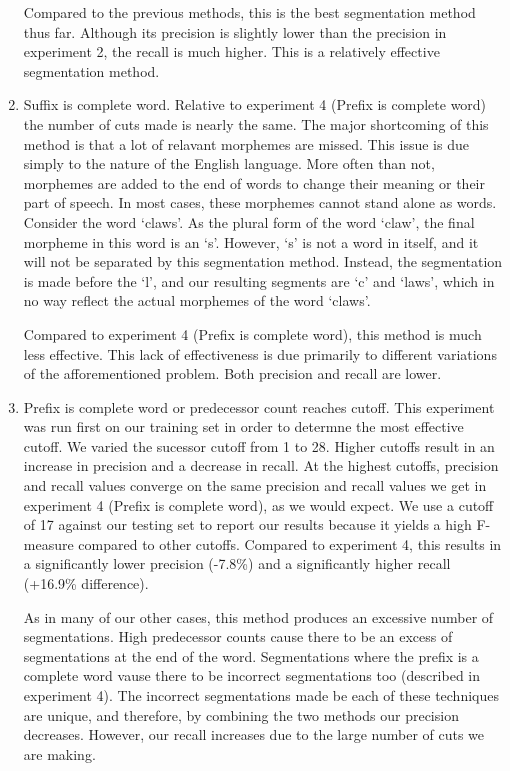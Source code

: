 \documentclass[11pt,letterpaper]{article}
\begin{document}
\begin{enumerate}
Compared to the previous methods, this is the best segmentation method thus far. Although its precision is slightly lower than the precision in experiment 2, the recall is much higher. This is a relatively effective segmentation method.

\item Suffix is complete word. Relative to experiment 4 (Prefix is complete word) the number of cuts made is nearly the same. The major shortcoming of this method is that a lot of relavant morphemes are missed. This issue is due simply to the nature of the English language. More often than not, morphemes are added to the end of words to change their meaning or their part of speech. In most cases, these morphemes cannot stand alone as words. Consider the word `claws'. As the plural form of the word `claw', the final morpheme in this word is an `s'. However, `s' is not a word in itself, and it will not be separated by this segmentation method. Instead, the segmentation is made before the `l', and our resulting segments are `c' and `laws', which in no way reflect the actual morphemes of the word `claws'.

Compared to experiment 4 (Prefix is complete word), this method is much less effective. This lack of effectiveness is due primarily to different variations of the afforementioned problem. Both precision and recall are lower.

\item Prefix is complete word or predecessor count reaches cutoff. This experiment was run first on our training set in order to determne the most effective cutoff. We varied the sucessor cutoff from 1 to 28. Higher cutoffs result in an increase in precision and a decrease in recall. At the highest cutoffs, precision and recall values converge on the same precision and recall values we get in experiment 4 (Prefix is complete word), as we would expect. We use a cutoff of 17 against our testing set to report our results because it yields a high F-measure compared to other cutoffs. Compared to experiment 4, this results in a significantly lower precision (-7.8\%) and a significantly higher recall (+16.9\% difference). 

  As in many of our other cases, this method produces an excessive number of segmentations. High predecessor counts cause there to be an excess of segmentations at the end of the word. Segmentations where the prefix is a complete word vause there to be incorrect segmentations too (described in experiment 4). The incorrect segmentations made be each of these techniques are unique, and therefore, by combining the two methods our precision decreases. However, our recall increases due to the large number of cuts we are making.


\end{enumerate}
\end{document}
